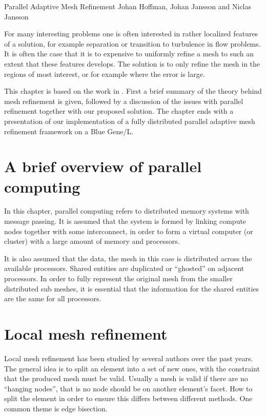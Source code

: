               {Parallel Adaptive Mesh Refinement}
              {Johan Hoffman, Johan Jansson and Niclas Jansson}

For many interesting problems one is often interested in rather
localized features of a solution, for example separation or transition
to turbulence in flow problems. It is often the case that it is to
expensive to uniformly refine a mesh to such an extent that these
features develops. The solution is to only refine the mesh in the
regions of most interest, or for example where the error is large.

This chapter is based on the work in \cite{Jan2008a}. First a brief
summary of the theory behind mesh refinement is given, followed by a
discussion of the issues with parallel refinement together with our
proposed solution. The chapter ends with a presentation of our
implementation of a fully distributed parallel adaptive mesh
refinement framework on a Blue Gene/L.


\section{A brief overview of parallel computing}
\label{sect:para}

In this chapter, parallel computing refers to distributed memory
systems with message passing. It is assumed that the system is formed
by linking compute nodes together with some interconnect, in order to
form a virtual computer (or cluster) with a large amount of memory and
processors.

It is also assumed that the data, the mesh in this case is distributed
across the available processors. Shared entities are duplicated or
``ghosted'' on adjacent processors. In order to fully represent the
original mesh from the smaller distributed sub meshes, it is essential
that the information for the shared entities are the same for all
processors.

\section{Local mesh refinement}

Local mesh refinement has been studied by several authors over the
past years. The general idea is to split an element into a set of new
ones, with the constraint that the produced mesh must be
valid. Usually a mesh is valid if there are no ``hanging nodes'', that
is no node should be on another element's facet. How to split the
element in order to ensure this differs between different methods. One
common theme is edge bisection.

